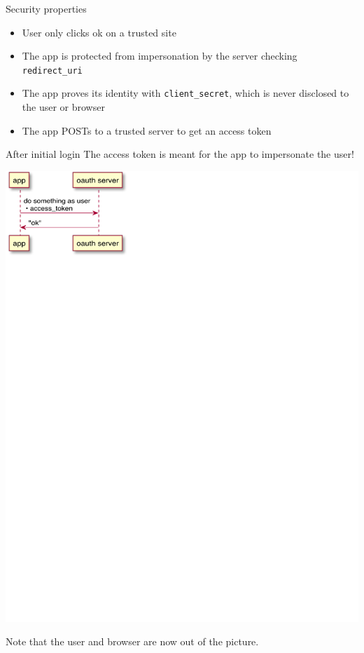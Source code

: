 \documentclass[xcolor=svgnames,17pt]{beamer}
\begin{document}
\begin{frame}{Security properties}
\begin{itemize}
\item User only clicks ok on a trusted site
\item The app is protected from impersonation by the server checking
\texttt{redirect\_uri}
\item The app proves its identity with \texttt{client\_secret}, which is
never disclosed to the user or browser
\item The app POSTs to a trusted server to get an access token
\end{itemize}
\end{frame}

\begin{frame}{After initial login}
The access token is meant for the app to impersonate the user!

\includegraphics[width=0.6\paperwidth,center]{uml-flow2.pdf}

Note that the user and browser are now out of the picture.
\end{frame}
\end{document}
